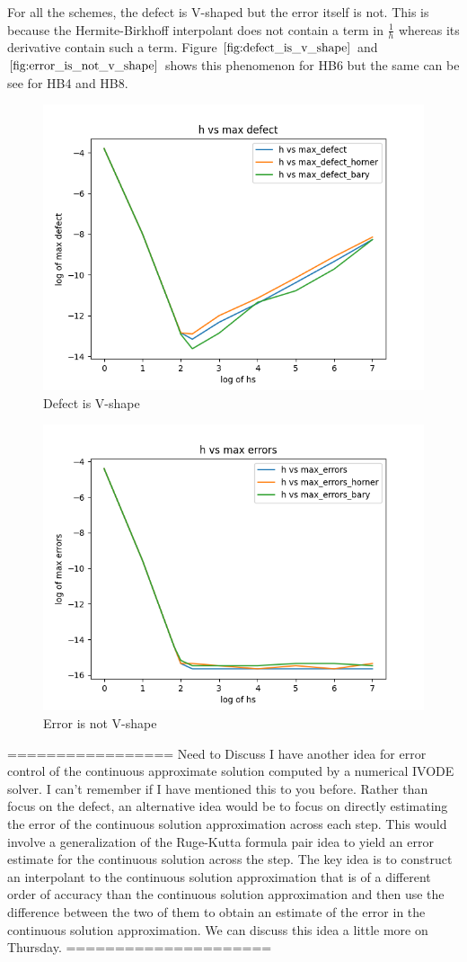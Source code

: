 \documentclass{article}
\begin{document}
For all the schemes, the defect is V-shaped but the error itself is not. This is because the Hermite-Birkhoff interpolant does not contain a term in $\frac{1}{h}$ whereas its derivative contain such a term. Figure $\ref{fig:defect_is_v_shape}$ and $\ref{fig:error_is_not_v_shape}$ shows this phenomenon for HB6 but the same can be see for HB4 and HB8. 

\begin{figure}[H]
\centering
\includegraphics[width=0.7\linewidth]{./figures/further_work_defect_is_v_shape_hb6}
\caption{Defect is V-shape}
\label{fig:defect_is_v_shape}
\end{figure}

\begin{figure}[H]
\centering
\includegraphics[width=0.7\linewidth]{./figures/further_work_error_is_not_v_shape_hb6}
\caption{Error is not V-shape}
\label{fig:error_is_not_v_shape}
\end{figure}

=================
Need to Discuss
I have another idea for error control of the continuous approximate
solution computed by a numerical IVODE solver. I can't remember if I
have mentioned this to you before. Rather than focus on the defect,
an alternative idea would be to focus on directly estimating
the error of the continuous solution approximation across each step.
This would involve a generalization of the Ruge-Kutta formula pair
idea to yield an error estimate for the continuous solution across
the step. The key idea is to construct an interpolant to the continuous
solution approximation that is of a different order of accuracy than the
continuous solution approximation and then use the difference between the
two of them to obtain an estimate of the error in the continuous
solution approximation. We can discuss this idea a little more on
Thursday.
=====================
\end{document}
